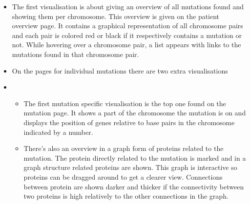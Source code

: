 \begin{itemize}
  \item The first visualisation is about giving an overview of all mutations found and showing them per chromosome. This overview is given on the patient overview page. It contains a graphical representation of all chromosome pairs and each pair is colored red or black if it respectively contains a mutation or not. While hovering over a chromosome pair, a list appears with links to the mutations found in that chromosome pair.
  \item On the pages for individual mutations there are two extra visualisations
  \item
  \begin{itemize}
     \item The first mutation specific visualisation is the top one found on the mutation page. It shows a part of the chromosome the mutation is on and displays the position of genes relative to base pairs in the chromosome indicated by a number.
     \item There's also an overview in a graph form of proteins related to the mutation. The protein directly related to the mutation is marked and in a graph structure related proteins are shown. This graph is interactive so proteins can be dragged around to get a clearer view. Connections between protein are shown darker and thicker if the connectivity between two proteins is high relatively to the other connections in the graph.
  \end{itemize}
\end{itemize}
